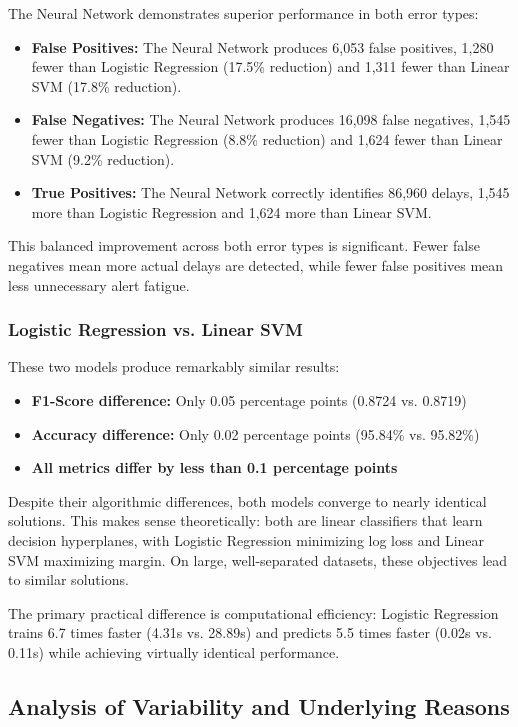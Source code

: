 \documentclass[sigconf]{acmart}
\begin{document}
The Neural Network demonstrates superior performance in both error types:
\begin{itemize}
    \item \textbf{False Positives:} The Neural Network produces 6,053 false positives, 1,280 fewer than Logistic Regression (17.5\% reduction) and 1,311 fewer than Linear SVM (17.8\% reduction).
    \item \textbf{False Negatives:} The Neural Network produces 16,098 false negatives, 1,545 fewer than Logistic Regression (8.8\% reduction) and 1,624 fewer than Linear SVM (9.2\% reduction).
    \item \textbf{True Positives:} The Neural Network correctly identifies 86,960 delays, 1,545 more than Logistic Regression and 1,624 more than Linear SVM.
\end{itemize}

This balanced improvement across both error types is significant. Fewer false negatives mean more actual delays are detected, while fewer false positives mean less unnecessary alert fatigue.

\subsubsection{Logistic Regression vs. Linear SVM}

These two models produce remarkably similar results:
\begin{itemize}
    \item \textbf{F1-Score difference:} Only 0.05 percentage points (0.8724 vs. 0.8719)
    \item \textbf{Accuracy difference:} Only 0.02 percentage points (95.84\% vs. 95.82\%)
    \item \textbf{All metrics differ by less than 0.1 percentage points}
\end{itemize}

Despite their algorithmic differences, both models converge to nearly identical solutions. This makes sense theoretically: both are linear classifiers that learn decision hyperplanes, with Logistic Regression minimizing log loss and Linear SVM maximizing margin. On large, well-separated datasets, these objectives lead to similar solutions.

The primary practical difference is computational efficiency: Logistic Regression trains 6.7 times faster (4.31s vs. 28.89s) and predicts 5.5 times faster (0.02s vs. 0.11s) while achieving virtually identical performance.

\subsection{Analysis of Variability and Underlying Reasons}
\end{document}
